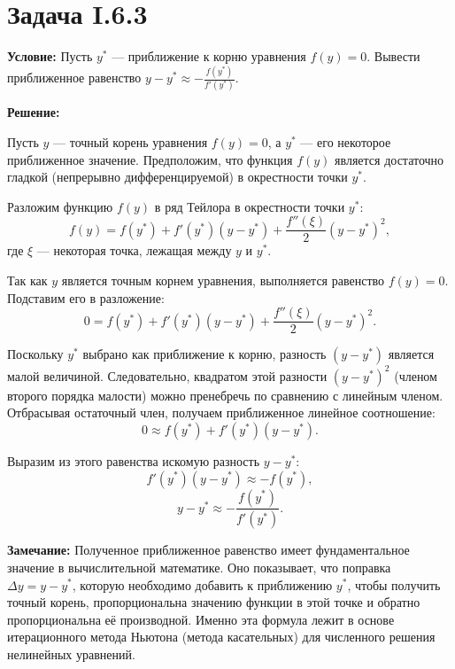 \documentclass{article}
\begin{document}
\section*{Задача I.6.3}

\textbf{Условие:} Пусть $y^*$ --- приближение к корню уравнения $f(y) = 0$. Вывести приближенное равенство $y - y^* \approx -\frac{f(y^*)}{f'(y^*)}$.

\vspace{0.5cm}
\textbf{Решение:}

Пусть $y$ --- точный корень уравнения $f(y) = 0$, а $y^*$ --- его некоторое приближенное значение. Предположим, что функция $f(y)$ является достаточно гладкой (непрерывно дифференцируемой) в окрестности точки $y^*$.

Разложим функцию $f(y)$ в ряд Тейлора в окрестности точки $y^*$:
\begin{equation}
f(y) = f(y^*) + f'(y^*)(y - y^*) + \frac{f''(\xi)}{2}(y - y^*)^2,
\end{equation}
где $\xi$ --- некоторая точка, лежащая между $y$ и $y^*$.

Так как $y$ является точным корнем уравнения, выполняется равенство $f(y) = 0$. Подставим его в разложение:
\begin{equation}
0 = f(y^*) + f'(y^*)(y - y^*) + \frac{f''(\xi)}{2}(y - y^*)^2.
\end{equation}

Поскольку $y^*$ выбрано как приближение к корню, разность $(y - y^*)$ является малой величиной. Следовательно, квадратом этой разности $(y - y^*)^2$ (членом второго порядка малости) можно пренебречь по сравнению с линейным членом. Отбрасывая остаточный член, получаем приближенное линейное соотношение:
\begin{equation}
0 \approx f(y^*) + f'(y^*)(y - y^*).
\end{equation}

Выразим из этого равенства искомую разность $y - y^*$:
\begin{equation}
f'(y^*)(y - y^*) \approx -f(y^*),
\end{equation}
\begin{equation}
y - y^* \approx -\frac{f(y^*)}{f'(y^*)}.
\end{equation}

\textbf{Замечание:} Полученное приближенное равенство имеет фундаментальное значение в вычислительной математике. Оно показывает, что поправка $\Delta y = y - y^*$, которую необходимо добавить к приближению $y^*$, чтобы получить точный корень, пропорциональна значению функции в этой точке и обратно пропорциональна её производной. Именно эта формула лежит в основе итерационного метода Ньютона (метода касательных) для численного решения нелинейных уравнений.
\end{document}
